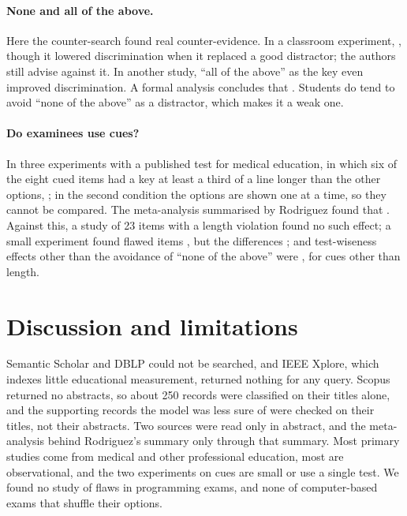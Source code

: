 \paragraph{None and all of the above.}
Here the counter-search found real counter-evidence.  In a classroom
experiment, , though it lowered discrimination when it
replaced a good distractor; the authors still advise against it.  In
another study, \enquote{all of the above} as the key even improved
discrimination\autocite[326]{Martinez2009}.  A formal analysis concludes
that .  Students do tend to avoid \enquote{none of the above} as a
distractor\autocite{DeVore2016}, which makes it a weak one.

\paragraph{Do examinees use cues?} In three experiments with a published
test for medical education, in which six of the eight cued items had a key
at least a third of a line longer than the other
options\autocite[252]{Willing2015}, ; in the second condition the
options are shown one at a time, so they cannot be compared.  The
meta-analysis summarised by Rodriguez found that
.
Against this, a study of 23 items with a length violation found no such
effect\autocite[329]{Martinez2009}; a small experiment found flawed items
, but the differences
; and test-wiseness effects
other than the avoidance of \enquote{none of the above} were
, for cues
other than length.

\section{Discussion and limitations}
\label{sec:item-flaws-discussion}

Semantic Scholar and DBLP could not be searched, and IEEE Xplore, which
indexes little educational measurement, returned nothing for any query.
Scopus returned no abstracts, so about 250 records were classified on
their titles alone, and the supporting records the model was less sure of
were checked on their titles, not their abstracts.  Two sources were read
only in abstract, and the meta-analysis behind Rodriguez's summary only
through that summary.  Most primary studies come from medical and other
professional education, most are observational, and the two experiments
on cues are small or use a single test.  We found no study of flaws in
programming exams, and none of computer-based exams that shuffle their
options.


